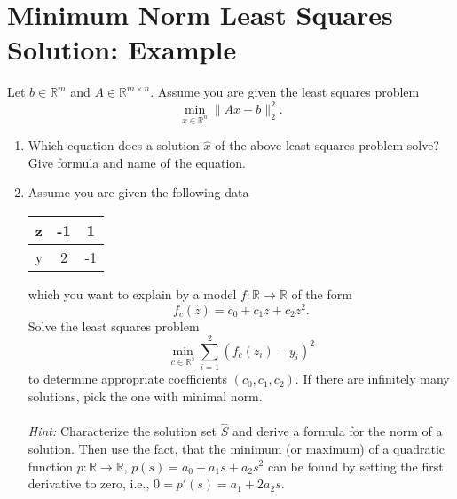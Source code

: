 \section{Minimum Norm Least Squares Solution: Example}


Let $b \in \mathbb{R}^m$ and $A \in \mathbb{R}^{m \times n}$.
Assume you are given the least squares problem 
$$
\min\limits_{x \in \mathbb{R}^n} \| Ax-b \|_2^2.
$$
\begin{enumerate}
	\item Which equation does a solution $\hat{x}$ of the above least squares problem solve? Give formula and name of the equation.
	\item Assume you are given the following data
	\begin{center}
		\begin{tabular}{l|cc}
			z&-1&1\\
			\hline
			y&2&-1
		\end{tabular}
	\end{center}
 which you want to explain by a model $f:\mathbb{R} \to \mathbb{R}$ of the form 
	$$f_c(z) = c_0 + c_1z + c_2z^2.$$
	Solve the least squares problem
	$$
	\min\limits_{c \in \mathbb{R}^3} \sum_{i=1}^2 (f_c(z_i) - y_i)^2
	$$
	to determine appropriate coefficients $(c_0, c_1, c_2)$. If there are infinitely many solutions, pick the one with minimal norm.\\~\\
	\textit{Hint:} Characterize the solution set $\hat{S}$ and derive a formula for the norm of a solution. Then use the fact, that the minimum (or maximum) of a quadratic function $p\colon\mathbb{R} \to \mathbb{R}$, $p(s)= a_0+a_1s+a_2s^2$ can be found by setting the first derivative to zero, i.e., $0=p'(s)=a_1+2a_2 s$.
\end{enumerate} 